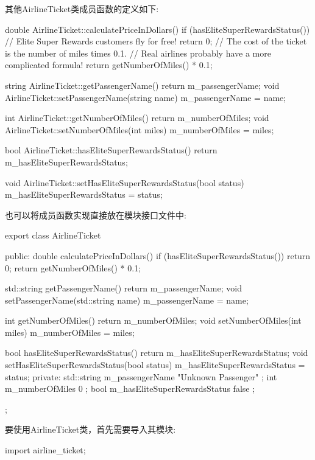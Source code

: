 其他AirlineTicket类成员函数的定义如下:

\begin{cpp}
double AirlineTicket::calculatePriceInDollars()
{
    if (hasEliteSuperRewardsStatus()) {
        // Elite Super Rewards customers fly for free!
        return 0;
    }
    // The cost of the ticket is the number of miles times 0.1.
    // Real airlines probably have a more complicated formula!
    return getNumberOfMiles() * 0.1;
}

string AirlineTicket::getPassengerName() { return m_passengerName; }
void AirlineTicket::setPassengerName(string name) { m_passengerName = name; }

int AirlineTicket::getNumberOfMiles() { return m_numberOfMiles; }
void AirlineTicket::setNumberOfMiles(int miles) { m_numberOfMiles = miles; }

bool AirlineTicket::hasEliteSuperRewardsStatus()
{
    return m_hasEliteSuperRewardsStatus;
}

void AirlineTicket::setHasEliteSuperRewardsStatus(bool status)
{
    m_hasEliteSuperRewardsStatus = status;
}
\end{cpp}

也可以将成员函数实现直接放在模块接口文件中:

\begin{cpp}
export class AirlineTicket
{
    public:
        double calculatePriceInDollars()
        {
            if (hasEliteSuperRewardsStatus()) { return 0; }
            return getNumberOfMiles() * 0.1;
        }

        std::string getPassengerName() { return m_passengerName; }
        void setPassengerName(std::string name) { m_passengerName = name; }

        int getNumberOfMiles() { return m_numberOfMiles; }
        void setNumberOfMiles(int miles) { m_numberOfMiles = miles; }

        bool hasEliteSuperRewardsStatus() { return m_hasEliteSuperRewardsStatus; }
        void setHasEliteSuperRewardsStatus(bool status)
        {
            m_hasEliteSuperRewardsStatus = status;
        }
    private:
        std::string m_passengerName { "Unknown Passenger" };
        int m_numberOfMiles { 0 };
        bool m_hasEliteSuperRewardsStatus { false };
};
\end{cpp}


要使用AirlineTicket类，首先需要导入其模块:

\begin{cpp}
import airline_ticket;
\end{cpp}

